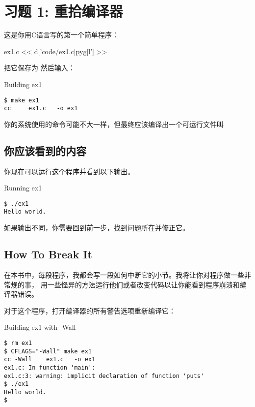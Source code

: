 \chapter{习题 1: 重拾编译器}

这是你用C语言写的第一个简单程序：

\begin{code}{ex1.c}
<< d['code/ex1.c|pyg|l'] >>
\end{code}

把它保存为  然后输入：

\begin{Terminal}{Building ex1}
\begin{lstlisting}
$ make ex1
cc     ex1.c   -o ex1
\end{lstlisting}
\end{Terminal}

你的系统使用的命令可能不大一样，但最终应该编译出一个可运行文件叫 

\section{你应该看到的内容}

你现在可以运行这个程序并看到以下输出。

\begin{Terminal}{Running ex1}
\begin{lstlisting}
$ ./ex1
Hello world.
\end{lstlisting}
\end{Terminal}

如果输出不同，你需要回到前一步，找到问题所在并修正它。

\section{How To Break It}

在本书中，每段程序，我都会写一段如何中断它的小节。我将让你对程序做一些非常规的事，
用一些怪异的方法运行他们或者改变代码以让你能看到程序崩溃和编译器错误。

对于这个程序，打开编译器的所有警告选项重新编译它：

\begin{Terminal}{Building ex1 with -Wall}
\begin{lstlisting}
$ rm ex1
$ CFLAGS="-Wall" make ex1
cc -Wall    ex1.c   -o ex1
ex1.c: In function 'main':
ex1.c:3: warning: implicit declaration of function 'puts'
$ ./ex1
Hello world.
$ 
\end{lstlisting}
\end{Terminal}


